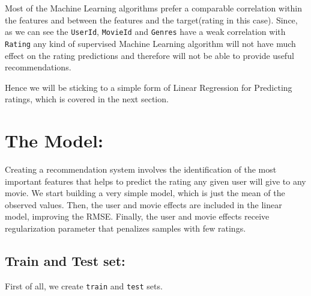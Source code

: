 \documentclass[
]{article}
\begin{document}
Most of the Machine Learning algorithms prefer a comparable correlation
within the features and between the features and the target(rating in
this case). Since, as we can see the \texttt{UserId}, \texttt{MovieId}
and \texttt{Genres} have a weak correlation with \texttt{Rating} any
kind of supervised Machine Learning algorithm will not have much effect
on the rating predictions and therefore will not be able to provide
useful recommendations.

Hence we will be sticking to a simple form of Linear Regression for
Predicting ratings, which is covered in the next section.\\
\newpage

\hypertarget{the-model}{%
\section{\texorpdfstring{\textbf{The
Model:}}{The Model:}}\label{the-model}}

Creating a recommendation system involves the identification of the most
important features that helps to predict the rating any given user will
give to any movie. We start building a very simple model, which is just
the mean of the observed values. Then, the user and movie effects are
included in the linear model, improving the RMSE. Finally, the user and
movie effects receive regularization parameter that penalizes samples
with few ratings.

\hypertarget{train-and-test-set}{%
\subsection{\texorpdfstring{\textbf{Train and Test
set:}}{Train and Test set:}}\label{train-and-test-set}}

First of all, we create \texttt{train} and \texttt{test} sets.
\end{document}
